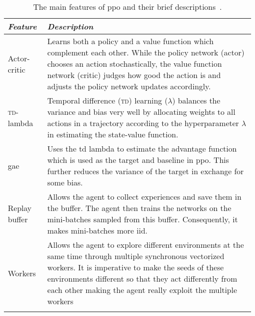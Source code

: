 \documentclass[../main.tex]{subfiles}
\begin{document}
\begin{table}[tb]
    \centering
    \caption{The main features of \gls{ppo} and their brief
    descriptions~\cite{ppo}.}
    \label{tab:ppo-features}
    \begin{tabularx}{\textwidth}{ X p{12.3cm} }
        \toprule
            \textit{Feature} 
                & \textit{Description}\\

        \midrule
        Actor-critic
                & 
                Learns both a policy and a value function which
                complement each other. 
                While the policy network (actor) chooses an action
                stochastically, the value function network (critic)
                judges how good the action is and adjusts the policy
                network updates accordingly. 
                \\ \addlinespace
        
        \textsc{td}-lambda
                & 
                Temporal difference (\textsc{td}) learning ($\lambda$)
                balances the variance and bias very well by allocating
                weights to all actions in a trajectory according to
                the hyperparameter $\lambda$ in estimating the
                state-value function. 
                \\ \addlinespace

        \gls{gae}
                & 
                Uses the \gls{td} lambda to estimate the advantage function
                which is used as the target and baseline in \gls{ppo}.
                This further reduces the variance of the target in
                exchange for some bias.
                \\ \addlinespace
        
        Replay buffer
                & 
                Allows the agent to collect experiences and save them
                in the buffer.
                The agent then trains the networks on the mini-batches
                sampled from this buffer.
                Consequently, it makes mini-batches more \gls{iid}.
                \\ \addlinespace

        Workers
                & 
                Allows the agent to explore different environments at
                the same time through multiple synchronous vectorized
                workers.
                It is imperative to make the seeds of these
                environments different so that they act differently
                from each other making the agent really exploit the
                multiple workers
                \\ \addlinespace
        

\end{tabularx}
\end{table}
\end{document}
